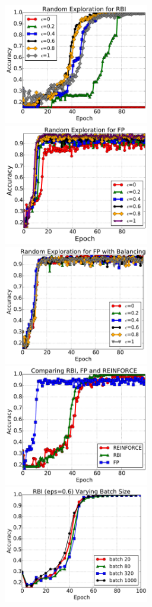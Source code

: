 \begin{figure}[!ht]
\includegraphics[width=2.5in]{img/RBI_eps6.pdf}
\includegraphics[width=2.5in]{img/FP_eps6.pdf}\\
\includegraphics[width=2.5in]{img/FP_eps_balance6.pdf}
\includegraphics[width=2.5in]{img/RBIvsRF6.pdf}\\
\includegraphics[width=2.5in]{img/RBIbatch6.pdf}

\end{figure}
